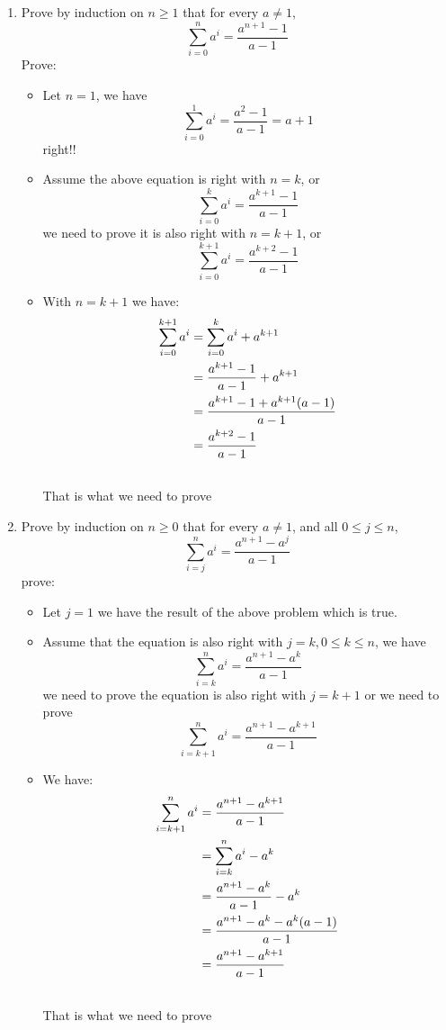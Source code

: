 \documentclass[11pt]{article}
\begin{document}
\begin {enumerate}
\item Prove by induction on $n \geq 1$ that for every $a \neq 1$,
$$
\sum_{i=0}^na^i = \frac{a^{n+1} -1}{a-1}
$$
Prove:
\begin{itemize}
\item Let $n=1$, we have $$\sum_{i=0}^1a^i = \frac{a^2-1}{a-1} = a+1$$ right!!
\item Assume the above equation is right with $n=k$, or $$\sum_{i=0}^ka^i = \frac{a^{k+1} -1}{a-1}$$ we need to prove it is also right with $n=k+1$, or $$\sum_{i=0}^{k+1}a^i = \frac{a^{k+2} -1}{a-1}$$
\item With $n=k+1$ we have: 
\begin{align}
  \sum_{i=0}^{k+1}a^i &= \sum_{i=0}^{k}a^i + a^{k+1} \\ \notag
  &= \frac{a^{k+1} -1}{a-1} + a^{k+1} \\ \notag
  &= \frac{a^{k+1} - 1 + a^{k+1}(a-1)}{a-1} \\ \notag
  &= \frac{a^{k+2} - 1}{a-1} \\ \notag
\end{align}
That is what we need to prove
\end{itemize}

\item Prove by induction on $n \geq 0$ that for every $a \neq 1$, and all $0\leq j \leq n$,
$$
\sum_{i=j}^na^i = \frac{a^{n+1} - a^j}{a-1}
$$
prove:
\begin{itemize}
\item Let $j = 1$ we have the result of the above problem which is true.
\item Assume that the equation is also right with $j=k, 0 \leq k \leq n$, we have
  $$
  \sum_{i=k}^na^i = \frac{a^{n+1} - a^k}{a-1}
  $$
  we need to prove the equation is also right with $j = k+1$ or we need to prove
  $$
  \sum_{i=k+1}^na^i = \frac{a^{n+1} - a^{k+1}}{a-1}
  $$
\item We have: 
  \begin {align}
    \sum_{i=k+1}^na^i &= \frac{a^{n+1} - a^{k+1}}{a-1} \\ \notag
    &= \sum_{i=k}^na^i - a^k \\ \notag
    &= \frac{a^{n+1} - a^k}{a-1} - a^k \\ \notag
    &= \frac{a^{n+1} - a^k - a^k(a-1)}{a-1} \\ \notag
    &= \frac{a^{n+1} - a^{k+1}}{a-1} \\ \notag
    \end{align}
That is what we need to prove
\end{itemize}


\end{enumerate}
\end{document}

